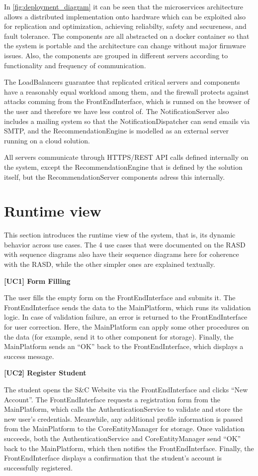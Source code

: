 In \ref{fig:deployment_diagram} it can be seen that the microservices architecture allows a distributed implementation onto hardware which can be exploited also for replication and optimization, achieving reliabilty, safety and secureness, and fault tolerance.
The components are all abstracted on a docker container so that the system is portable and the architecture can change without major firmware issues. Also, the components are grouped in different servers according to functionality and frequency of communication.

The LoadBalancers guarantee that replicated critical servers and components have a reasonably equal workload among them, and the firewall protects against attacks comming from the FrontEndInterface, which is runned on the browser of the user and therefore we have less control of. The NotificationServer also includes a mailing system so that the NotificationDispatcher can send emails via SMTP, and the RecommendationEngine is modelled as an external server running on a cloud solution. 

All servers communicate through HTTPS/REST API calls defined internally on the system, except the RecommendationEngine that is defined by the solution itself, but the RecommendationServer components adress this internally.

\section{Runtime view}

This section introduces the runtime view of the system, that is, its dynamic behavior across use cases. The 4 use cases that were documented on the RASD with sequence diagrams also have their sequence diagrams here for coherence with the RASD, while the other simpler ones are explained textually.

\textbf{[UC1] Form Filling}

The user fills the empty form on the FrontEndInterface and submits it. The FrontEndInterface sends the data to the MainPlatform, which runs its validation logic. In case of validation failure, an error is returned to the FrontEndInterface for user correction. Here, the MainPlatform can apply some other procedures on the data (for example, send it to other component for storage). Finally, the MainPlatform sends an ``OK'' back to the FrontEndInterface, which displays a success message.


\textbf{[UC2] Register Student}

The student opens the S\&C Website via the FrontEndInterface and clicks ``New Account''. The FrontEndInterface requests a registration form from the MainPlatform, which calls the AuthenticationService to validate and store the new user’s credentials. Meanwhile, any additional profile information is passed from the MainPlatform to the CoreEntityManager for storage. Once validation succeeds, both the AuthenticationService and CoreEntityManager send ``OK'' back to the MainPlatform, which then notifies the FrontEndInterface. Finally, the FrontEndInterface displays a confirmation that the student’s account is successfully registered.

